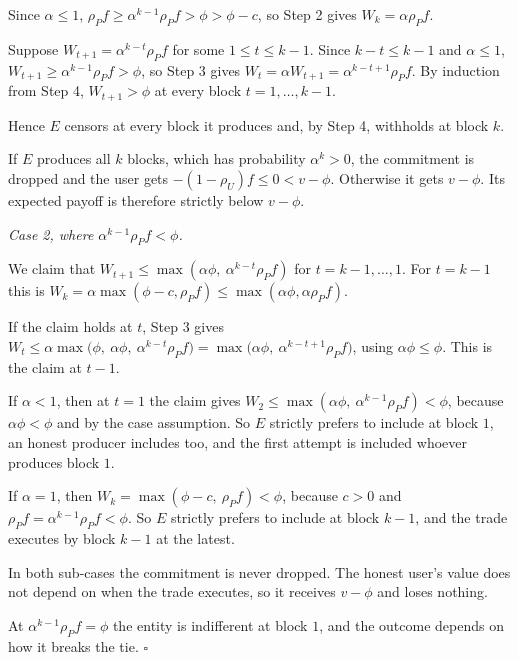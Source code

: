 \documentclass[11pt]{article}
\newenvironment{steps}{\begin{list}{}{\setlength{\leftmargin}{3.6em}\setlength{\labelwidth}{3.2em}\setlength{\labelsep}{0.4em}\setlength{\itemsep}{2pt}\setlength{\topsep}{3pt}\setlength{\parsep}{0pt}\renewcommand{\makelabel}[1]{##1\hfil}}}{\end{list}}
\begin{document}
\begin{steps}
\item[\emph{Step 4.}] Since $\alpha\le1$, $\rho_P f\ge\alpha^{k-1}\rho_P f>\phi>\phi-c$, so Step 2 gives $W_k=\alpha\rho_P f$.
\item[\emph{Step 5.}] Suppose $W_{t+1}=\alpha^{k-t}\rho_P f$ for some $1\le t\le k-1$. Since $k-t\le k-1$ and $\alpha\le1$, $W_{t+1}\ge\alpha^{k-1}\rho_P f>\phi$, so Step 3 gives $W_t=\alpha W_{t+1}=\alpha^{k-t+1}\rho_P f$. By induction from Step 4, $W_{t+1}>\phi$ at every block $t=1,\dots,k-1$.
\item[\emph{Step 6.}] Hence $E$ censors at every block it produces and, by Step 4, withholds at block $k$.
\item[\emph{Step 7.}] If $E$ produces all $k$ blocks, which has probability $\alpha^k>0$, the commitment is dropped and the user gets $-(1-\rho_U)f\le0<v-\phi$. Otherwise it gets $v-\phi$. Its expected payoff is therefore strictly below $v-\phi$.
\end{steps}
\emph{Case 2, where $\alpha^{k-1}\rho_P f<\phi$.}
\begin{steps}
\item[\emph{Step 8.}] We claim that $W_{t+1}\le\max(\alpha\phi,\ \alpha^{k-t}\rho_P f)$ for $t=k-1,\dots,1$. For $t=k-1$ this is $W_k=\alpha\max(\phi-c,\rho_P f)\le\max(\alpha\phi,\alpha\rho_P f)$.
\item[\emph{Step 9.}] If the claim holds at $t$, Step 3 gives $W_t\le\alpha\max\big(\phi,\ \alpha\phi,\ \alpha^{k-t}\rho_P f\big)=\max\big(\alpha\phi,\ \alpha^{k-t+1}\rho_P f\big)$, using $\alpha\phi\le\phi$. This is the claim at $t-1$.
\item[\emph{Step 10.}] If $\alpha<1$, then at $t=1$ the claim gives $W_2\le\max(\alpha\phi,\ \alpha^{k-1}\rho_P f)<\phi$, because $\alpha\phi<\phi$ and by the case assumption. So $E$ strictly prefers to include at block $1$, an honest producer includes too, and the first attempt is included whoever produces block $1$.
\item[\emph{Step 11.}] If $\alpha=1$, then $W_k=\max(\phi-c,\ \rho_P f)<\phi$, because $c>0$ and $\rho_P f=\alpha^{k-1}\rho_P f<\phi$. So $E$ strictly prefers to include at block $k-1$, and the trade executes by block $k-1$ at the latest.
\item[\emph{Step 12.}] In both sub-cases the commitment is never dropped. The honest user's value does not depend on when the trade executes, so it receives $v-\phi$ and loses nothing.
\end{steps}
At $\alpha^{k-1}\rho_P f=\phi$ the entity is indifferent at block $1$, and the outcome depends on how it breaks the tie. \hfill$\square$
\end{document}
